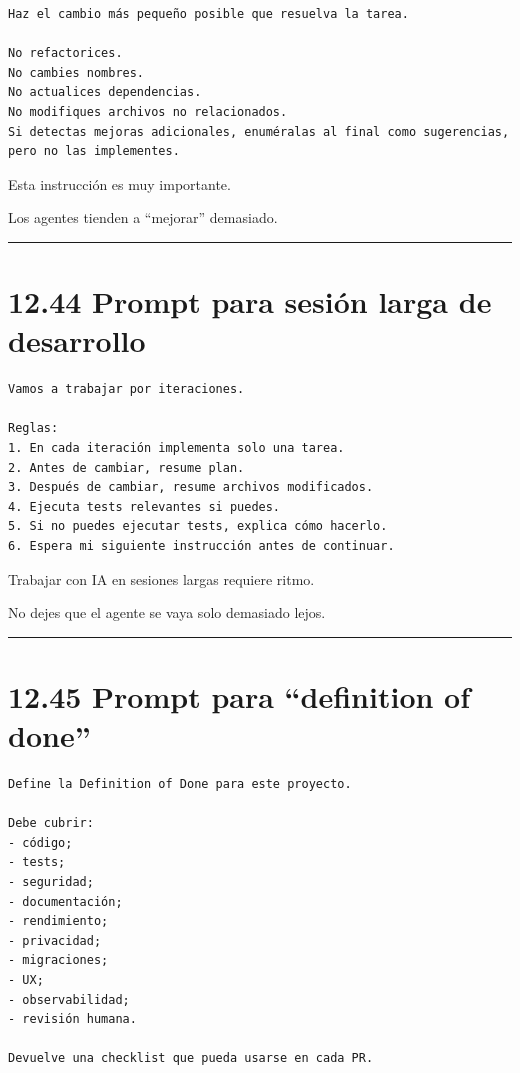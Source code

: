 \begin{lstlisting}
Haz el cambio más pequeño posible que resuelva la tarea.

No refactorices.
No cambies nombres.
No actualices dependencias.
No modifiques archivos no relacionados.
Si detectas mejoras adicionales, enuméralas al final como sugerencias, pero no las implementes.
\end{lstlisting}

Esta instrucción es muy importante.

Los agentes tienden a ``mejorar'' demasiado.

\begin{center}\rule{0.5\linewidth}{0.5pt}\end{center}

\section{12.44 Prompt para sesión larga de
desarrollo}\label{prompt-para-sesiuxf3n-larga-de-desarrollo}

\begin{lstlisting}
Vamos a trabajar por iteraciones.

Reglas:
1. En cada iteración implementa solo una tarea.
2. Antes de cambiar, resume plan.
3. Después de cambiar, resume archivos modificados.
4. Ejecuta tests relevantes si puedes.
5. Si no puedes ejecutar tests, explica cómo hacerlo.
6. Espera mi siguiente instrucción antes de continuar.
\end{lstlisting}

Trabajar con IA en sesiones largas requiere ritmo.

No dejes que el agente se vaya solo demasiado lejos.

\begin{center}\rule{0.5\linewidth}{0.5pt}\end{center}

\section{12.45 Prompt para ``definition of
done''}\label{prompt-para-definition-of-done}

\begin{lstlisting}
Define la Definition of Done para este proyecto.

Debe cubrir:
- código;
- tests;
- seguridad;
- documentación;
- rendimiento;
- privacidad;
- migraciones;
- UX;
- observabilidad;
- revisión humana.

Devuelve una checklist que pueda usarse en cada PR.
\end{lstlisting}

